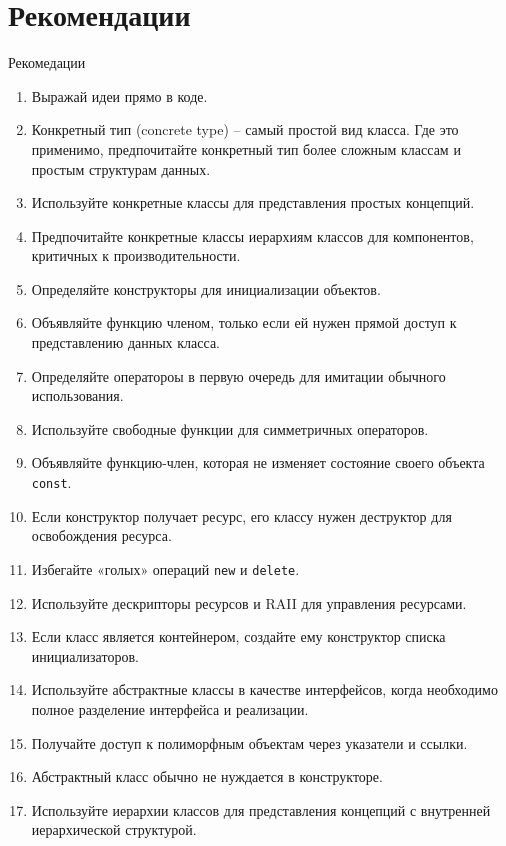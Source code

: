 \documentclass[
    8pt,
    hyperref={pdfencoding=unicode}
    ]{beamer}
\theoremstyle{definition}
\begin{document}
\section{Рекомендации}

\begin{frame}{Рекомедации}
    \begin{enumerate}
        \item Выражай идеи прямо в коде.
        \item Конкретный тип (concrete type) -- самый простой вид класса. Где это применимо, предпочитайте конкретный тип более сложным классам и простым структурам данных.
        \item Используйте конкретные классы для представления простых концепций.
        \item Предпочитайте конкретные классы иерархиям классов для компонентов, критичных к производительности.
        \item Определяйте конструкторы для инициализации объектов.
        \item Объявляйте функцию членом, только если ей нужен прямой доступ к представлению данных класса.
        \item Определяйте оператороы в первую очередь для имитации обычного использования.
        \item Используйте свободные функции для симметричных операторов.
        \item Объявляйте функцию-член, которая не изменяет состояние своего объекта \texttt{const}.
        \item Если конструктор получает ресурс, его классу нужен деструктор для освобождения ресурса.
        \item Избегайте «голых» операций \texttt{new} и \texttt{delete}.
        \item Используйте дескрипторы ресурсов и RAII для управления ресурсами.
        \item Если класс является контейнером, создайте ему конструктор списка инициализаторов.
        \item Используйте абстрактные классы в качестве интерфейсов, когда необходимо полное разделение интерфейса и реализации.
        \item Получайте доступ к полиморфным объектам через указатели и ссылки.
        \item Абстрактный класс обычно не нуждается в конструкторе.
        \item Используйте иерархии классов для представления концепций с внутренней иерархической структурой.

\end{enumerate}
\end{frame}
\end{document}
